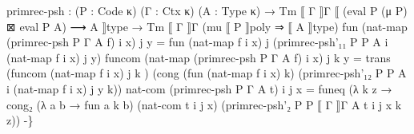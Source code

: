{\begin{code}
{primrec{-}psh : (P : Code κ) (Γ : Ctx κ) (A : Type κ)
  → Tm ⟦ Γ ⟧Γ ⟦ (eval P (μ P) ⊠ eval P A) ⟶ A ⟧type
  → Tm ⟦ Γ ⟧Γ (mu ⟦ P ⟧poly ⇒ ⟦ A ⟧type)
fun (nat{-}map (primrec{-}psh P Γ A f) i x) j y = fun (nat{-}map f i x) j (primrec{-}psh'₁₁ P P A i (nat{-}map f i x) j y)
funcom (nat{-}map (primrec{-}psh P Γ A f) i x) j k y =
  trans (funcom (nat{-}map f i x) j k \AgdaUnderscore{})
        (cong (fun (nat{-}map f i x) k) (primrec{-}psh'₁₂ P P A i (nat{-}map f i x) j y k))
nat{-}com (primrec{-}psh P Γ A t) i j x = funeq (λ k z → cong₂ (λ a b → fun a k b) (nat{-}com t i j x) (primrec{-}psh'₂ P P ⟦ Γ ⟧Γ A t i j x k z))
{-}\}}\<%
\\
%
\\[\AgdaEmptyExtraSkip]%
\>[0]\AgdaSpace{}%
\AgdaSymbol{:}\AgdaSpace{}%
\AgdaSymbol{(}\AgdaSpace{}%
\AgdaSpace{}%
\AgdaSymbol{:}\AgdaSpace{}%
\AgdaSpace{}%
\AgdaSymbol{)}\AgdaSpace{}%
\AgdaSpace{}%
\AgdaSpace{}%
\AgdaSpace{}%
\AgdaSpace{}%
\AgdaSpace{}%
\AgdaSpace{}%
\AgdaSpace{}%
\AgdaSpace{}%
\AgdaSpace{}%
\AgdaSymbol{(}\AgdaSpace{}%
\AgdaSymbol{:}\AgdaSpace{}%
\AgdaSymbol{)}\AgdaSpace{}%
\AgdaSpace{}%
\AgdaSpace{}%
\AgdaSpace{}%
\AgdaSpace{}%
\AgdaSpace{}%
\AgdaSpace{}%
\AgdaSpace{}%
\AgdaSpace{}%
\AgdaSpace{}%
\AgdaSpace{}%
\<%
\\
\>[0]\AgdaSpace{}%
\AgdaSpace{}%
\AgdaSymbol{(}\AgdaSpace{}%
\AgdaSymbol{)}\AgdaSpace{}%
\AgdaSymbol{(}\AgdaSpace{}%
\AgdaSymbol{)}\AgdaSpace{}%
\AgdaSpace{}%
\AgdaSymbol{=}\AgdaSpace{}%
\AgdaSpace{}%
\<%
\\
\>[0]\AgdaSpace{}%
\AgdaSpace{}%
\AgdaSpace{}%
\AgdaSymbol{(}\AgdaSpace{}%
\AgdaSymbol{)}\AgdaSpace{}%
\AgdaSpace{}%
\AgdaSymbol{=}\AgdaSpace{}%
\AgdaSpace{}%

\end{code}}
